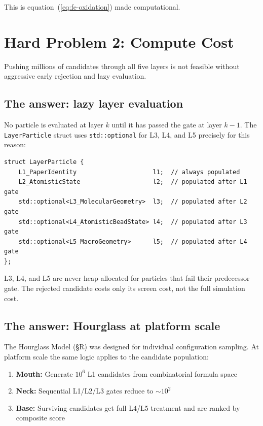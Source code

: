\documentclass[11pt, a4paper, oneside]{article}
\theoremstyle{definition}
\newcommand{\type}[1]{\texttt{#1}}
\begin{document}
This is equation~(\ref{eq:fe-oxidation}) made computational.

\section{Hard Problem 2: Compute Cost}
\label{sec:compute}

\begin{tcolorbox}[colback=hardcol, colframe=red!70!black,
  title={Hard Problem 2: Compute Cost},
  fonttitle=\bfseries\small]
Pushing millions of candidates through all five layers is not feasible
without aggressive early rejection and lazy evaluation.
\end{tcolorbox}

\subsection{The answer: lazy layer evaluation}

No particle is evaluated at layer $k$ until it has passed the gate at
layer $k-1$.  The \type{LayerParticle} struct uses \texttt{std::optional}
for L3, L4, and L5 precisely for this reason:

\begin{lstlisting}
struct LayerParticle {
    L1_PaperIdentity                     l1;  // always populated
    L2_AtomisticState                    l2;  // populated after L1 gate
    std::optional<L3_MolecularGeometry>  l3;  // populated after L2 gate
    std::optional<L4_AtomisticBeadState> l4;  // populated after L3 gate
    std::optional<L5_MacroGeometry>      l5;  // populated after L4 gate
};
\end{lstlisting}

L3, L4, and L5 are never heap-allocated for particles that fail their
predecessor gate.  The rejected candidate costs only its screen cost,
not the full simulation cost.

\subsection{The answer: Hourglass at platform scale}

The Hourglass Model (§R) was designed for individual configuration
sampling.  At platform scale the same logic applies to the candidate
population:

\begin{enumerate}
  \item \textbf{Mouth:} Generate $10^6$ L1 candidates from combinatorial
        formula space
  \item \textbf{Neck:} Sequential L1/L2/L3 gates reduce to $\sim 10^2$
  \item \textbf{Base:} Surviving candidates get full L4/L5 treatment and
        are ranked by composite score
\end{enumerate}
\end{document}

